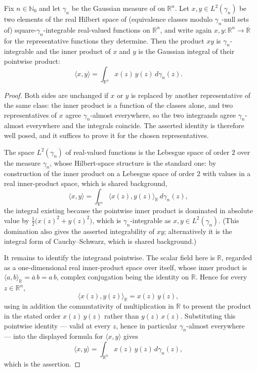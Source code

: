\begin{lemma}
Fix $n \in \mathbb{N}_0$ and let $\gamma_n$ be the Gaussian measure of
 on $\mathbb{R}^n$.  Let $x, y \in L^2(\gamma_n)$ be two
elements of the real Hilbert space of (equivalence classes modulo
$\gamma_n$-null sets of) square-$\gamma_n$-integrable real-valued functions on
$\mathbb{R}^n$, and write again $x, y : \mathbb{R}^n \to \mathbb{R}$ for the
representative functions they determine.  Then the product $xy$ is
$\gamma_n$-integrable and the inner product of $x$ and $y$ is the Gaussian
integral of their pointwise product:
\[
  \langle x, y \rangle
    = \int_{\mathbb{R}^n} x(z)\,y(z) \, d\gamma_n(z) .
\]
\end{lemma}
\begin{proof}
Both sides are unchanged if $x$ or $y$ is replaced by another representative of
the same class: the inner product is a function of the classes alone, and two
representatives of $x$ agree $\gamma_n$-almost everywhere, so the two integrands
agree $\gamma_n$-almost everywhere and the integrals coincide.  The asserted
identity is therefore well posed, and it suffices to prove it for the chosen
representatives.

The space $L^2(\gamma_n)$ of real-valued functions is the Lebesgue space of
order $2$ over the measure $\gamma_n$, whose Hilbert-space structure is the
standard one: by construction of the inner product on a Lebesgue space of order
$2$ with values in a real inner-product space, which is shared background,
\[
  \langle x, y \rangle
    = \int_{\mathbb{R}^n} \langle x(z), y(z) \rangle_{\mathbb{R}} \, d\gamma_n(z) ,
\]
the integral existing because the pointwise inner product is dominated in
absolute value by $\tfrac12\bigl(x(z)^2 + y(z)^2\bigr)$, which is
$\gamma_n$-integrable as $x, y \in L^2(\gamma_n)$.  (This domination also gives
the asserted integrability of $xy$; alternatively it is the integral form of
Cauchy--Schwarz, which is shared background.)

It remains to identify the integrand pointwise.  The scalar field here is
$\mathbb{R}$, regarded as a one-dimensional real inner-product space over
itself, whose inner product is
$\langle a, b \rangle_{\mathbb{R}} = \bar{a}\,b = a\,b$, complex conjugation
being the identity on $\mathbb{R}$.  Hence for every $z \in \mathbb{R}^n$,
\[
  \langle x(z), y(z) \rangle_{\mathbb{R}} = x(z)\,y(z) ,
\]
using in addition the commutativity of multiplication in $\mathbb{R}$ to present
the product in the stated order $x(z)\,y(z)$ rather than $y(z)\,x(z)$.
Substituting this pointwise identity --- valid at every $z$, hence in particular
$\gamma_n$-almost everywhere --- into the displayed formula for
$\langle x, y \rangle$ gives
\[
  \langle x, y \rangle = \int_{\mathbb{R}^n} x(z)\,y(z)\, d\gamma_n(z),
\]
which is the assertion.
\end{proof}
